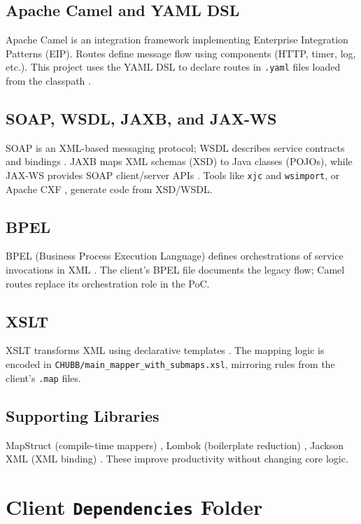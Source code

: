 \documentclass[11pt]{article}
\begin{document}
\subsection{Apache Camel and YAML DSL}
Apache Camel is an integration framework implementing Enterprise Integration Patterns (EIP). Routes define message flow using components (HTTP, timer, log, etc.). This project uses the YAML DSL to declare routes in \texttt{.yaml} files loaded from the classpath \cite{camel-docs}. 

\subsection{SOAP, WSDL, JAXB, and JAX-WS}
SOAP is an XML-based messaging protocol; WSDL describes service contracts and bindings \cite{soap-spec, wsdl-spec}. JAXB maps XML schemas (XSD) to Java classes (POJOs), while JAX-WS provides SOAP client/server APIs \cite{jaxb-docs, jaxws-docs}. Tools like \texttt{xjc} and \texttt{wsimport}, or Apache CXF \cite{cxf-docs}, generate code from XSD/WSDL. 

\subsection{BPEL}
BPEL (Business Process Execution Language) defines orchestrations of service invocations in XML \cite{bpel-spec}. The client’s BPEL file documents the legacy flow; Camel routes replace its orchestration role in the PoC. 

\subsection{XSLT}
XSLT transforms XML using declarative templates \cite{xslt-spec}. The mapping logic is encoded in \texttt{CHUBB/main\_mapper\_with\_submaps.xsl}, mirroring rules from the client’s \texttt{.map} files. 

\subsection{Supporting Libraries}
MapStruct (compile-time mappers) \cite{mapstruct}, Lombok (boilerplate reduction) \cite{lombok}, Jackson XML (XML binding) \cite{jackson-xml}. These improve productivity without changing core logic.

\section{Client \texttt{Dependencies} Folder}
\end{document}

